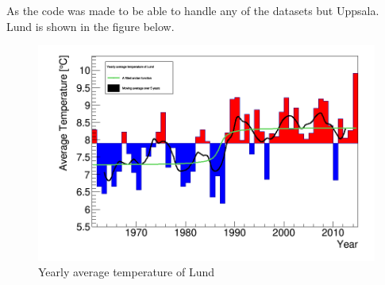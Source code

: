\documentclass{article}
\begin{document}
As the code was made to be able to handle any of the datasets but Uppsala. Lund is shown in the figure below. 

	

\begin{figure}
    \centering
		\includegraphics[width=14cm]{yearAvg_Lund.png}
		\caption{Yearly average temperature of Lund}
		\label{Lund}
\end{figure}
\end{document}
